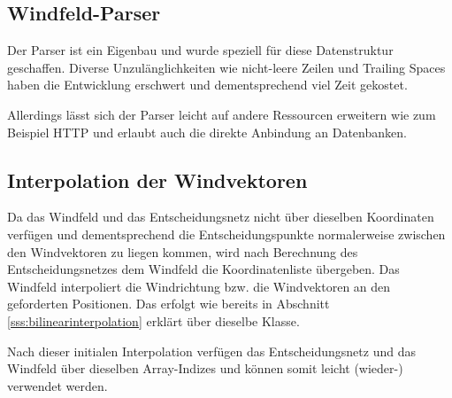 \subsection{Windfeld-Parser}
Der Parser ist ein Eigenbau und wurde speziell für diese Datenstruktur
geschaffen. Diverse Unzulänglichkeiten wie nicht-leere Zeilen und Trailing
Spaces haben die Entwicklung erschwert und dementsprechend viel Zeit gekostet.

Allerdings lässt sich der Parser leicht auf andere Ressourcen erweitern wie zum
Beispiel HTTP und erlaubt auch die direkte Anbindung an Datenbanken.

\subsection{Interpolation der Windvektoren}
Da das Windfeld und das Entscheidungsnetz nicht über dieselben Koordinaten
verfügen und dementsprechend die Entscheidungspunkte normalerweise zwischen den
Windvektoren zu liegen kommen, wird nach Berechnung des Entscheidungsnetzes dem
Windfeld die Koordinatenliste übergeben. Das Windfeld interpoliert die
Windrichtung bzw. die Windvektoren an den geforderten Positionen. Das erfolgt
wie bereits in Abschnitt \ref{sss:bilinearinterpolation} erklärt über dieselbe
Klasse.

Nach dieser initialen Interpolation verfügen das Entscheidungsnetz und das
Windfeld über dieselben Array-Indizes und können somit leicht (wieder-)
verwendet werden.
